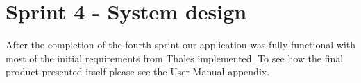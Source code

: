 \section{Sprint 4 - System design}


After the completion of the fourth sprint our application was fully functional with most of the initial requirements from Thales implemented. To see how the final product presented itself please see the User Manual appendix.